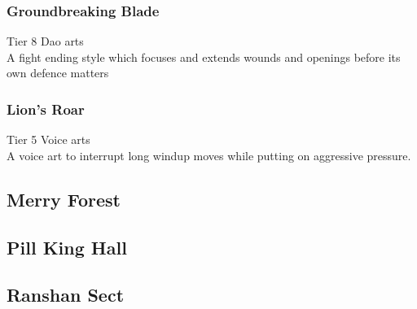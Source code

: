 \subsubsection{Groundbreaking Blade}
Tier 8 Dao arts\\
A fight ending style which focuses and extends wounds and openings before its own defence matters

\subsubsection{Lion's Roar}
Tier 5 Voice arts\\
A voice art to interrupt long windup moves while putting on aggressive pressure.

\subsection{Merry Forest} %
\subsubsection{}

\subsubsection{}

\subsubsection{}

\subsection{Pill King Hall} %
\subsubsection{}

\subsubsection{}

\subsubsection{}

\subsection{Ranshan Sect}
